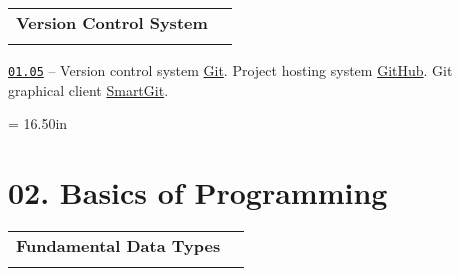 \documentclass[a4paper,12pt]{article}
\renewenvironment{itemize}
{
    \begin{list}{\labelitemi}
    {
      \setlength{\topsep}{0pt}
      \setlength{\partopsep}{0pt}
      \setlength{\parskip}{0pt}
      \setlength{\itemsep}{0pt}
      \setlength{\parsep}{0pt}
      \setlength{\leftmargin}{14.5pt}
    }
}{\end{list}}
\begin{document}
\bigskip\medskip

\begin{tabular}{!{\vrule width 1pt}L{4.7cm}!{\vrule width 1pt}L{14.3cm}!{\vrule width 0pt}} 


\textbf{Version Control System} & \\


\end{tabular}

\medskip\smallskip

\begin{itemize}

    \item \href{https://github.com/i-s-m-mipt/Education/blob/master/projects/examples/source/01.05.pdf}{\texttt{01.05}} -- Version control system \href{https://git-scm.com/}{Git}. Project hosting system \href{https://github.com/}{GitHub}. Git graphical client \href{https://www.smartgit.dev/}{SmartGit}.
    
\end{itemize}



\newpage\thispagestyle{empty}\pdfpageheight = 16.50in\enlargethispage{100in}

\section{02. Basics of Programming}

\begin{tabular}{!{\vrule width 1pt}L{5.0cm}!{\vrule width 1pt}L{14.0cm}!{\vrule width 0pt}} 


\textbf{Fundamental Data Types} & \\


\end{tabular}

\medskip\smallskip
\end{document}
